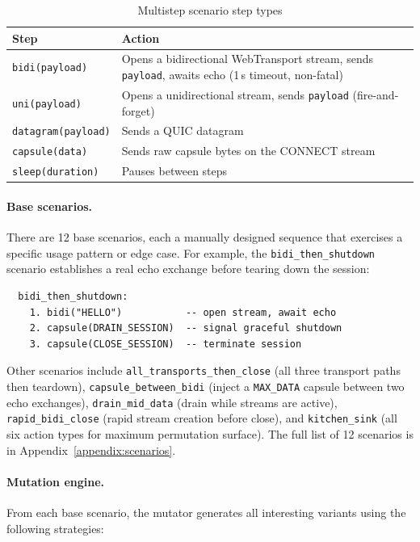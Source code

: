 \begin{table}[ht]
\centering
\caption{Multistep scenario step types}
\label{tab:step-types}
\begin{tabular}{lp{9cm}}
\hline
\textbf{Step} & \textbf{Action} \\
\hline
\texttt{bidi(payload)} & Opens a bidirectional WebTransport stream, sends \texttt{payload}, awaits echo (1\,s timeout, non-fatal) \\
\texttt{uni(payload)} & Opens a unidirectional stream, sends \texttt{payload} (fire-and-forget) \\
\texttt{datagram(payload)} & Sends a QUIC datagram \\
\texttt{capsule(data)} & Sends raw capsule bytes on the CONNECT stream \\
\texttt{sleep(duration)} & Pauses between steps \\
\hline
\end{tabular}
\end{table}

\paragraph{Base scenarios.} There are 12 base scenarios, each a manually designed sequence that exercises a specific usage pattern or edge case. For example, the \texttt{bidi\_then\_shutdown} scenario establishes a real echo exchange before tearing down the session:

\begin{verbatim}
  bidi_then_shutdown:
    1. bidi("HELLO")           -- open stream, await echo
    2. capsule(DRAIN_SESSION)  -- signal graceful shutdown
    3. capsule(CLOSE_SESSION)  -- terminate session
\end{verbatim}

Other scenarios include \texttt{all\-\_transports\-\_then\-\_close} (all three transport paths then teardown), \texttt{capsule\-\_between\-\_bidi} (inject a \texttt{MAX\_DATA} capsule between two echo exchanges), \texttt{drain\-\_mid\-\_data} (drain while streams are active), \texttt{rapid\-\_bidi\-\_close} (rapid stream creation before close), and \texttt{kitchen\-\_sink} (all six action types for maximum permutation surface). The full list of 12 scenarios is in Appendix~\ref{appendix:scenarios}.

\paragraph{Mutation engine.} From each base scenario, the mutator generates all interesting variants using the following strategies:

